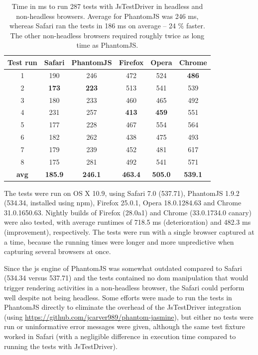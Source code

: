 \documentclass[11pt]{article}
\begin{document}
\begin{table}
  \centering
    \begin{tabular}{ c | c c c c c}
    Test run & Safari  &  PhantomJS  &  Firefox  &  Opera  &  Chrome \\ \hline
     1           &  190    &        246         &    472    &     524    &    \textbf{486}   \\
     2           &  \textbf{173}    &        \textbf{223}         &    513    &     541    &    539   \\
     3           &  180    &        233         &    460    &     465    &    492   \\
     4           &  231    &        257         &    \textbf{413}    &     \textbf{459}    &    551   \\
     5           &  177    &        228         &    467    &     554    &    564   \\
     6           &  182    &        262         &    438    &     475    &    493   \\
     7           &  179    &        239         &    452    &     481    &    617   \\
     8           &  175    &        281         &    492    &     541    &    571   \\
     \textbf{avg}  &  \textbf{185.9}  &    \textbf{246.1}    &    \textbf{463.4}  &   \textbf{505.0} &   \textbf{539.1} \\
    \end{tabular}
  \caption{Time in ms to run 287 tests with JsTestDriver in headless and non-headless browsers. Average for PhantomJS was 246 ms, whereas Safari ran the tests in 186 ms on average -- 24 \% faster. The other non-headless browsers required roughly twice as long time as PhantomJS.}
  \label{tab:testruns}
\end{table}

The tests were run on OS X 10.9, using Safari 7.0 (537.71), PhantomJS 1.9.2 (534.34, installed using npm), Firefox 25.0.1, Opera 18.0.1284.63 and Chrome 31.0.1650.63. Nightly builds of Firefox (28.0a1) and Chrome (33.0.1734.0 canary) were also tested, with average runtimes of 718.5 ms (deterioration) and 482.3 ms (improvement), respectively. The tests were run with a single browser captured at a time, because the running times were longer and more unpredictive when capturing several browsers at once.

Since the \gls{js} engine of PhantomJS was somewhat outdated compared to Safari (534.34 versus 537.71) and the tests contained no dom manipulation that would trigger rendering activities in a non-headless browser, the Safari could perform well despite not being headless. Some efforts were made to run the tests in PhantomJS directly to eliminate the overhead of the JsTestDriver integration (using \url{https://github.com/jcarver989/phantom-jasmine}), but either no tests were run or uninformative error messages were given, although the same test fixture worked in Safari (with a negligible difference in execution time compared to running the tests with JsTestDriver).
\end{document}
